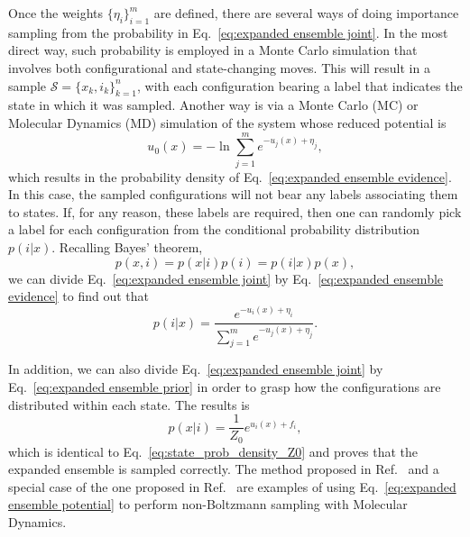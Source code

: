 \documentclass[aip,jcp,reprint,amsmath,amssymb]{revtex4-1}
\begin{document}
Once the weights $\{\eta_i\}_{i=1}^m$ are defined, there are several ways of doing importance sampling from the probability in Eq.~\eqref{eq:expanded ensemble joint}. In the most direct way, such probability is employed in a Monte Carlo simulation that involves both configurational and state-changing moves.\cite{Lyubartsev_1992} This will result in a sample $\mathcal S = \{x_k,i_k\}_{k=1}^n$, with each configuration bearing a label that indicates the state in which it was sampled. Another way is via a Monte Carlo (MC) or Molecular Dynamics (MD) simulation of the system whose reduced potential is
\begin{equation}
\label{eq:expanded ensemble potential}
u_0(x) = - \ln \sum_{j=1}^m e^{-u_j(x) + \eta_j},
\end{equation}
which results in the probability density of Eq.~\eqref{eq:expanded ensemble evidence}. In this case, the sampled configurations will not bear any labels associating them to states. If, for any reason, these labels are required, then one can randomly pick a label for each configuration from the conditional probability distribution $p(i|x)$.\cite{Nymeyer_2010} Recalling Bayes' theorem,
\begin{equation}
\label{eq:bayer theorem}
p(x,i) = p(x|i) p(i) = p(i|x) p(x),
\end{equation}
we can divide Eq.~\eqref{eq:expanded ensemble joint} by Eq.~\eqref{eq:expanded ensemble evidence} to find out that
\begin{equation}
\label{eq:expanded ensemble posterior}
p(i|x) = \frac{e^{-u_i(x) + \eta_i}}{\sum_{j=1}^m e^{-u_j(x) + \eta_j}}.
\end{equation}

In addition, we can also divide Eq.~\eqref{eq:expanded ensemble joint} by Eq.~\eqref{eq:expanded ensemble prior} in order to grasp how the configurations are distributed within each state. The results is
\begin{equation}
\label{eq:expanded ensemble likelihood}
p(x|i) = \frac{1}{Z_0} e^{u_i(x) + f_i},
\end{equation}
which is identical to Eq.~\eqref{eq:state_prob_density_Z0} and proves that the expanded ensemble is sampled correctly. The method proposed in Ref.~ and a special case of the one proposed in Ref.~ are examples of using Eq.~\eqref{eq:expanded ensemble potential} to perform non-Boltzmann sampling with Molecular Dynamics.
\end{document}

